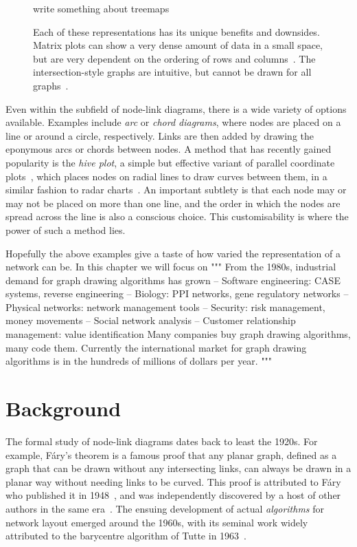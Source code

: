 \begin{figure}
\caption{Each of these representations has its unique benefits and downsides. Matrix plots can show a very dense amount of data in a small space, but are very dependent on the ordering of rows and columns~\cite{Liiv2010}.
The intersection-style graphs are intuitive, but cannot be drawn for all graphs~\cite{TODO}.}
write something about treemaps
\label{fig:graph_representations}
\end{figure}

Even within the subfield of node-link diagrams, there is a wide variety of options available.
Examples include \emph{arc} or \emph{chord diagrams}, where nodes are placed on a line or around a circle, respectively. Links are then added by drawing the eponymous arcs or chords between nodes.
A method that has recently gained popularity is the \emph{hive plot}, a simple but effective variant of parallel coordinate plots~\cite{Krzywinski2012}, which places nodes on radial lines to draw curves between them, in a similar fashion to radar charts~\cite{Porter2018}. An important subtlety is that each node may or may not be placed on more than one line, and the order in which the nodes are spread across the line is also a conscious choice. This customisability is where the power of such a method lies.

Hopefully the above examples give a taste of how varied the representation of a network can be. In this chapter we will focus on 
"""
 From the 1980s, industrial demand for graph drawing algorithms has grown
– Software engineering: CASE systems, reverse engineering – Biology: PPI networks, gene regulatory networks
– Physical networks: network management tools
– Security: risk management, money movements
– Social network analysis
– Customer relationship management: value identification Many companies buy graph drawing algorithms, many code them.
Currently the international market for graph drawing algorithms is in the hundreds of millions of dollars per year.
"""

\section{Background}
\label{sec:nodes_background}
The formal study of node-link diagrams dates back to least the 1920s. For example, F\'ary's theorem is a famous proof that any planar graph, defined as a graph that can be drawn without any intersecting links, can always be drawn in a planar way without needing links to be curved. This proof is attributed to F\'ary who published it in 1948~\cite{Fary1948}, and was independently discovered by a host of other authors in the same era~\cite{Steinitz1922, Wagner1936, Koebe1936, Stein1951}.
The ensuing development of actual \emph{algorithms} for network layout emerged around the 1960s, with its seminal work widely attributed to the barycentre algorithm of Tutte in 1963~\cite{Tutte1963}. 

